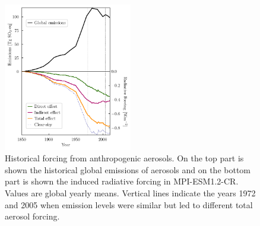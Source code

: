 \documentclass[draft]{agujournal2019}
\begin{document}
      \begin{figure}
            \centering
            \noindent\includegraphics[width=0.5\textwidth]{../../figures/figure1}
            \caption{Historical forcing from anthropogenic aerosols. On the top part is shown the historical global emissions of aerosols and on the bottom part is shown the induced radiative forcing in MPI-ESM1.2-CR. Values are global yearly means. Vertical lines indicate the years 1972 and 2005 when emission levels were similar but led to different total aerosol forcing.}
            \label{fig:figure1}
      \end{figure}
\end{document}
